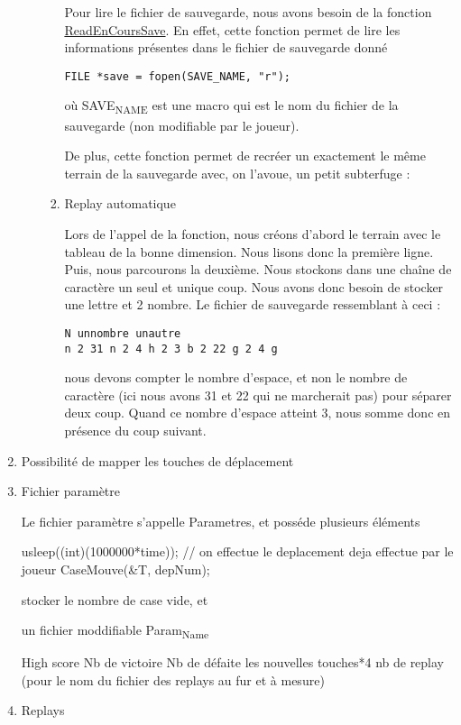 \documentclass[letter]{article}
\begin{document}
\begin{enumerate}
\begin{enumerate}
\begin{enumerate}
Pour lire le fichier de sauvegarde, nous avons besoin de la fonction \hyperref[sec:org2ded51b]{ReadEnCoursSave}. En effet, cette fonction permet de lire les informations présentes dans le fichier de sauvegarde donné

\begin{verbatim}
FILE *save = fopen(SAVE_NAME, "r");
\end{verbatim}

où SAVE\textsubscript{NAME} est une macro qui est le nom du fichier de la sauvegarde (non modifiable par le joueur).

De plus, cette fonction permet de recréer un exactement le même terrain de la sauvegarde avec, on l'avoue, un petit subterfuge :



\item Replay automatique
\label{sec:org86a4097}

Lors de l'appel de la fonction, nous créons d'abord le terrain avec le tableau de la bonne dimension. Nous lisons donc la première ligne.
Puis, nous parcourons la deuxième. Nous stockons dans une chaîne de caractère un seul et unique coup. Nous avons donc besoin de stocker une lettre et 2 nombre.
Le fichier de sauvegarde ressemblant à ceci :

\begin{verbatim}
N unnombre unautre
n 2 31 n 2 4 h 2 3 b 2 22 g 2 4 g 
\end{verbatim}

nous devons compter le nombre d'espace, et non le nombre de caractère (ici nous avons 31 et 22 qui ne marcherait pas) pour séparer deux coup. Quand ce nombre d'espace atteint 3, nous somme donc en présence du coup suivant.
\end{enumerate}
\end{enumerate}


\item Possibilité de mapper les touches de déplacement
\label{sec:org1fd6767}

\item Fichier paramètre
\label{sec:org0af3236}

Le fichier paramètre s'appelle Parametres, et posséde plusieurs éléments



usleep((int)(1000000*time));
// on effectue le deplacement deja effectue par le joueur
CaseMouve(\&T, depNum);

stocker le nombre de case vide, et


un fichier moddifiable
Param\textsubscript{Name}

High score
Nb de victoire
Nb de défaite
les nouvelles touches*4
nb de replay (pour le nom du fichier des replays au fur et à mesure)


\item Replays
\label{sec:orgb4af942}
\end{enumerate}
\end{document}
